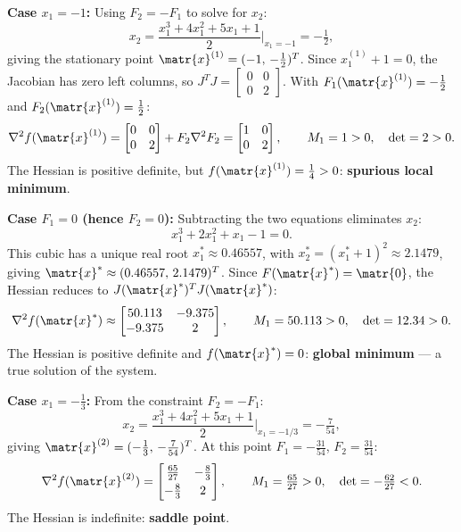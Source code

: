 \medskip
\noindent\textbf{Case $x_1 = -1$:}
Using $F_2 = -F_1$ to solve for $x_2$:
\begin{equation*}
  x_2 = \frac{x_1^3 + 4x_1^2 + 5x_1 + 1}{2}\bigg|_{x_1=-1} = -\tfrac{1}{2},
\end{equation*}
giving the stationary point $\matr{x}^{(1)} = (-1,\,-\tfrac{1}{2})^T$.
Since $x_1^{(1)} + 1 = 0$, the Jacobian has zero left columns, so
$J^T J = \begin{bmatrix} 0 & 0 \\ 0 & 2 \end{bmatrix}$.
With $F_1(\matr{x}^{(1)}) = -\tfrac{1}{2}$ and $F_2(\matr{x}^{(1)}) = \tfrac{1}{2}$:
\begin{equation*}
  \nabla^2 f(\matr{x}^{(1)}) =
  \begin{bmatrix} 0 & 0 \\ 0 & 2 \end{bmatrix}
  + F_2 \nabla^2 F_2 =
  \begin{bmatrix} 1 & 0 \\ 0 & 2 \end{bmatrix},\qquad
  M_1 = 1 > 0,\quad \det = 2 > 0.
\end{equation*}
The Hessian is positive definite, but $f(\matr{x}^{(1)}) = \tfrac{1}{4} > 0$:
\textbf{spurious local minimum}.

\medskip
\noindent\textbf{Case $F_1 = 0$ (hence $F_2 = 0$):}
Subtracting the two equations eliminates $x_2$:
\begin{equation*}
  x_1^3 + 2x_1^2 + x_1 - 1 = 0.
\end{equation*}
This cubic has a unique real root $x_1^* \approx 0.46557$, with
$x_2^* = (x_1^*+1)^2 \approx 2.1479$, giving $\matr{x}^* \approx (0.46557,\,2.1479)^T$.
Since $F(\matr{x}^*) = \matr{0}$, the Hessian reduces to $J(\matr{x}^*)^T J(\matr{x}^*)$:
\begin{equation*}
  \nabla^2 f(\matr{x}^*) \approx
  \begin{bmatrix} 50.113 & -9.375 \\ -9.375 & 2 \end{bmatrix},\qquad
  M_1 = 50.113 > 0,\quad \det = 12.34 > 0.
\end{equation*}
The Hessian is positive definite and $f(\matr{x}^*) = 0$:
\textbf{global minimum} --- a true solution of the system.

\medskip
\noindent\textbf{Case $x_1 = -\tfrac{1}{3}$:}
From the constraint $F_2 = -F_1$:
\begin{equation*}
  x_2 = \frac{x_1^3 + 4x_1^2 + 5x_1 + 1}{2}\bigg|_{x_1=-1/3} = -\tfrac{7}{54},
\end{equation*}
giving $\matr{x}^{(2)} = (-\tfrac{1}{3},\,-\tfrac{7}{54})^T$.
At this point $F_1 = -\tfrac{31}{54}$, $F_2 = \tfrac{31}{54}$:
\begin{equation*}
  \nabla^2 f(\matr{x}^{(2)}) =
  \begin{bmatrix} \tfrac{65}{27} & -\tfrac{8}{3} \\[3pt] -\tfrac{8}{3} & 2 \end{bmatrix},\qquad
  M_1 = \tfrac{65}{27} > 0,\quad \det = -\tfrac{62}{27} < 0.
\end{equation*}
The Hessian is indefinite: \textbf{saddle point}.


